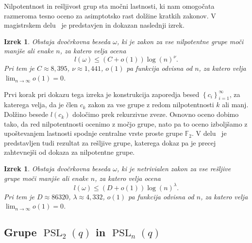 \documentclass[12pt,a4paper]{article}
\newcounter{theoremcounter}[section] %
\newtheorem{izrek}[theoremcounter]{Izrek}
\newtheorem{definicija}[theoremcounter]{Definicija}
\begin{document}
Nilpotentnost in rešljivost grup sta močni lastnosti, ki nam omogočata razmeroma tesno oceno za asimptotsko rast dolžine kratkih zakonov. 
V magistrskem delu~\cite{Schneider_2016} je predstavjen in dokazan naslednji izrek.
\begin{izrek}
Obstaja dvočrkovna beseda $\omega$, ki je zakon za vse nilpotentne grupe moči manjše ali enake $n$, za katero velja ocena \begin{equation*}
l(\omega) \le (C + o(1)) \log(n)^{\nu}. 
\end{equation*}  
Pri tem je $C \approx 8,395$, $\nu \approx 1,441$, $o(1)$ pa funkcija odvisna od $n$, za katero velja $\lim_{n \to \infty} o(1) = 0$. 
\end{izrek}
\noindent
Prvi korak pri dokazu tega izreka je konstrukcija zaporedja besed $\left\{ c_i \right\}_{i = 1}^{\infty}$, za katerega velja, da je člen $c_k$ zakon za
vse grupe z redom nilpotentnosti $k$ ali manj. Dolžino besede $l(c_k)$ določimo prek rekurzivne zveze. Osnovno oceno dobimo tako, da red nilpotentnosti ocenimo z močjo grupe, nato pa to oceno izboljšamo z upoštevanjem lastnosti spodnje centralne
vrste proste grupe $\mathbb{F}_2$.
\noindent
V delu~\cite{Schneider_2016} je predstavljen tudi rezultat za rešljive grupe, katerega dokaz pa je precej zahtevnejši od dokaza za nilpotentne grupe.
\begin{izrek}
    Obstaja dvočrkovna beseda $\omega$, ki je netrivialen zakon za vse rešljive grupe moči manjše ali enake $n$, za katero velja ocena \begin{equation*}
    l(\omega) \le (D + o(1)) \log(n)^{\lambda}. 
    \end{equation*}  
    Pri tem je $D \approx 86320$, $\lambda \approx 4,332$, $o(1)$ pa funkcija odvisna od $n$, za katero velja $\lim_{n \to \infty} o(1) = 0$. 
    \end{izrek}

\subsection{Grupe $\operatorname{PSL}_2(q)$ in $\operatorname{PSL}_n(q)$}
\end{document}
